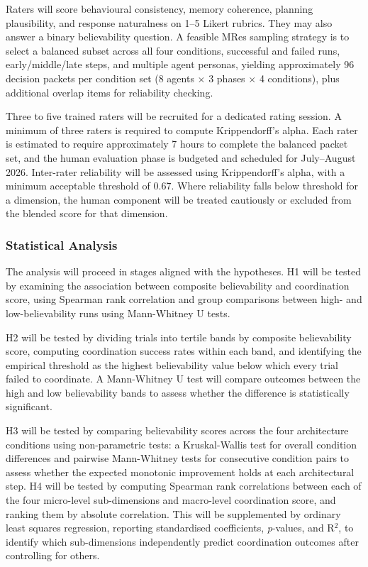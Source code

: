 \documentclass[11pt]{article}
\begin{document}
Raters will score behavioural consistency, memory coherence, planning plausibility, and response naturalness on 1--5 Likert rubrics. They may also answer a binary believability question. A feasible MRes sampling strategy is to select a balanced subset across all four conditions, successful and failed runs, early/middle/late steps, and multiple agent personas, yielding approximately 96 decision packets per condition set (8 agents $\times$ 3 phases $\times$ 4 conditions), plus additional overlap items for reliability checking.

Three to five trained raters will be recruited for a dedicated rating session. A minimum of three raters is required to compute Krippendorff's alpha. Each rater is estimated to require approximately 7 hours to complete the balanced packet set, and the human evaluation phase is budgeted and scheduled for July--August 2026. Inter-rater reliability will be assessed using Krippendorff's alpha, with a minimum acceptable threshold of 0.67. Where reliability falls below threshold for a dimension, the human component will be treated cautiously or excluded from the blended score for that dimension.

\subsubsection{Statistical Analysis}
The analysis will proceed in stages aligned with the hypotheses. H1 will be tested by examining the association between composite believability and coordination score, using Spearman rank correlation and group comparisons between high- and low-believability runs using Mann-Whitney U tests.

H2 will be tested by dividing trials into tertile bands by composite believability score, computing coordination success rates within each band, and identifying the empirical threshold as the highest believability value below which every trial failed to coordinate. A Mann-Whitney U test will compare outcomes between the high and low believability bands to assess whether the difference is statistically significant.

H3 will be tested by comparing believability scores across the four architecture conditions using non-parametric tests: a Kruskal-Wallis test for overall condition differences and pairwise Mann-Whitney tests for consecutive condition pairs to assess whether the expected monotonic improvement holds at each architectural step. H4 will be tested by computing Spearman rank correlations between each of the four micro-level sub-dimensions and macro-level coordination score, and ranking them by absolute correlation. This will be supplemented by ordinary least squares regression, reporting standardised coefficients, \textit{p}-values, and R$^{2}$, to identify which sub-dimensions independently predict coordination outcomes after controlling for others.
\end{document}
